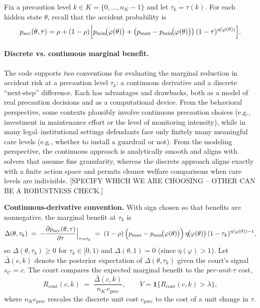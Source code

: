 \documentclass{article}
\begin{document}
Fix a precaution level $k\in K=\{0,\dots,n_K-1\}$ and let $\tau_k=\tau(k)$. For each hidden state $\theta$, recall that the accident probability is
\[
p_{\mathrm{acc}}(\theta,\tau)
=\rho+(1-\rho)\Bigl[p_{\min}\!\bigl(\varphi(\theta)\bigr)
+\bigl(p_{\max}-p_{\min}\!\bigl(\varphi(\theta)\bigr)\bigr)\,(1-\tau)^{\eta(\varphi(\theta))}\Bigr].
\]
\paragraph{Discrete vs. continuous marginal benefit.}
The code supports \emph{two} conventions for evaluating the marginal reduction in accident risk at a precaution level \(\tau_k\): a continuous derivative and a discrete “next-step” difference. Each has advantages and drawbacks, both as a model of real precaution decisions and as a computational device. From the behavioral perspective, some contexts plausibly involve continuous precaution choices (e.g., investment in maintenance effort or the level of monitoring intensity), while in many legal–institutional settings defendants face only finitely many meaningful care levels (e.g., whether to install a guardrail or not). From the modeling perspective, the continuous approach is analytically smooth and aligns with solvers that assume fine granularity, whereas the discrete approach aligns exactly with a finite action space and permits cleaner welfare comparisons when care levels are indivisible. [SPECIFY WHICH WE ARE CHOOSING -- OTHER CAN BE A ROBUSTNESS CHECK.]

\medskip
\noindent\textbf{Continuous-derivative convention.}
With sign chosen so that benefits are nonnegative, the marginal benefit at \(\tau_k\) is
\[
\Delta(\theta,\tau_k)
\;=\;-\frac{\partial p_{\mathrm{acc}}(\theta,\tau)}{\partial \tau}\Big|_{\tau=\tau_k}
\;=\;(1-\rho)\,\Bigl(p_{\max}-p_{\min}\!\bigl(\varphi(\theta)\bigr)\Bigr)\,\eta\!\bigl(\varphi(\theta)\bigr)\,(1-\tau_k)^{\eta(\varphi(\theta))-1},
\]
so \(\Delta(\theta,\tau_k)\ge 0\) for \(\tau_k\in[0,1)\) and \(\Delta(\theta,1)=0\) (since \(\eta(\varphi)>1\)). Let \(\bar{\Delta}(c,k)\) denote the posterior expectation of \(\Delta(\theta,\tau_k)\) given the court’s signal \(s_C=c\). The court compares the expected marginal benefit to the \emph{per-unit-\(\tau\)} cost,
\[
R_{\mathrm{cont}}(c,k)\;=\;\frac{\bar{\Delta}(c,k)}{\,n_K\,c_{\mathrm{prec}}\,},
\qquad
V=\mathbf{1}\!\{R_{\mathrm{cont}}(c,k)>\lambda\},
\]
where \(n_K c_{\mathrm{prec}}\) rescales the discrete unit cost \(c_{\mathrm{prec}}\) to the cost of a unit change in \(\tau\).
\end{document}
